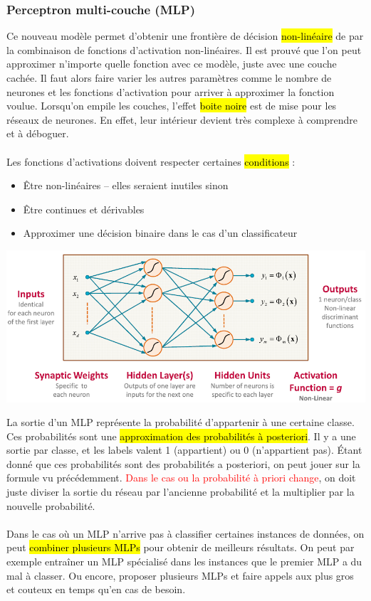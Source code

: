 \documentclass[letterpaper, 12pt]{article}
\newcommand{\alinea}{
\hspace*{0.5cm}}
\newcommand{\red}[1]{
	\textcolor{red}{#1}}
\begin{document}
			\subsubsection{Perceptron multi-couche (MLP)}
				\alinea Ce nouveau modèle permet d'obtenir une frontière de décision \hl{non-linéaire} de par la combinaison de fonctions
					d'activation non-linéaires. Il est prouvé que l'on peut approximer n'importe quelle fonction avec ce modèle,
					juste avec une couche cachée. Il faut alors faire varier les autres paramètres comme le nombre de neurones et 
					les fonctions d'activation pour arriver à approximer la fonction voulue. Lorsqu'on empile les couches, l'effet
					\hl{boite noire} est de mise pour les réseaux de neurones. En effet, leur intérieur devient très complexe à 
					comprendre et à déboguer.\\
				~\\
				\alinea Les fonctions d'activations doivent respecter certaines \hl{conditions} : 
					\begin{itemize}
						\setlength\itemsep{0cm}
						\item Être non-linéaires -- elles seraient inutiles sinon
						\item Être continues et dérivables
						\item Approximer une décision binaire dans le cas d'un classificateur
					\end{itemize}
				\begin{center}
					\includegraphics[width=6in]{Images/mlp}
				\end{center}
				\alinea La sortie d'un MLP représente la probabilité d'appartenir à une certaine classe. Ces probabilités sont une 
					\hl{approximation des probabilités à posteriori}. Il y a une sortie par classe, et les labels valent 1 (appartient)
					ou 0 (n'appartient pas). \'Etant donné que ces probabilités sont des probabilités a posteriori, on peut jouer
					sur la formule vu précédemment. \red{Dans le cas ou la probabilité à priori change}, on doit juste diviser
					la sortie du réseau par l'ancienne probabilité et la multiplier par la nouvelle probabilité. \\
				~\\
				\alinea Dans le cas où un MLP n'arrive pas à classifier certaines instances de données, on peut 
					\hl{combiner plusieurs MLPs}
					pour obtenir de meilleurs résultats. On peut par exemple entraîner un MLP spécialisé dans les instances que
					le premier MLP a du mal à classer. Ou encore, proposer plusieurs MLPs et faire appels aux plus gros et couteux en
					temps qu'en cas de besoin.
\end{document}
